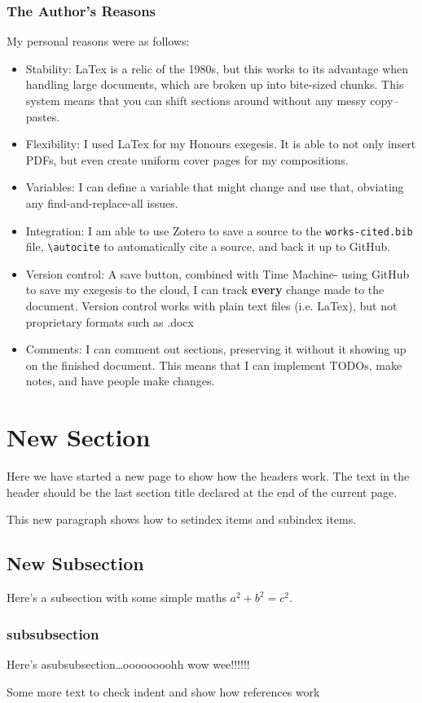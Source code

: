 \subsubsection{The Author's Reasons}
My personal reasons were as follows:
\begin{itemize}
    \item Stability: LaTex is a relic of the 1980s, but this works to its advantage when handling large documents, which are broken up into bite-sized chunks. This system means that you can shift sections around without any messy copy--pastes.
    \item Flexibility: I used LaTex for my Honours exegesis. It is able to not only insert PDFs, but even create uniform cover pages for my compositions.
    \item Variables: I can define a variable that might change and use that, obviating any find-and-replace-all issues.
    \item Integration: I am able to use Zotero to save a source to the \lstinline{works-cited.bib} file, \lstinline{\autocite} to automatically cite a source, and back it up to GitHub.
    \item Version control: A save button, combined with Time Machine- using GitHub to save my exegesis to the cloud, I can track \textbf{every} change made to the document. Version control works with plain text files (i.e. LaTex), but not proprietary formats such as .docx
    \item Comments: I can comment out sections, preserving it without it showing up on the finished document. This means that I can implement TODOs, make notes, and have people make changes.
\end{itemize}


\newpage
\section{New Section}
Here we have started a new page to show how the headers work. The
text in the header should be the last section title declared at
the end of the current page.

This new paragraph shows how to setindex items
and subindex items.

\subsection{New Subsection}
Here's a subsection with some simple maths $a^2+b^2=c^2$.

\subsubsection{subsubsection}
Here's asubsubsection\ldots oooooooohh wow
wee!!!!!!

\newpage
Some more text to check indent and show how references work

